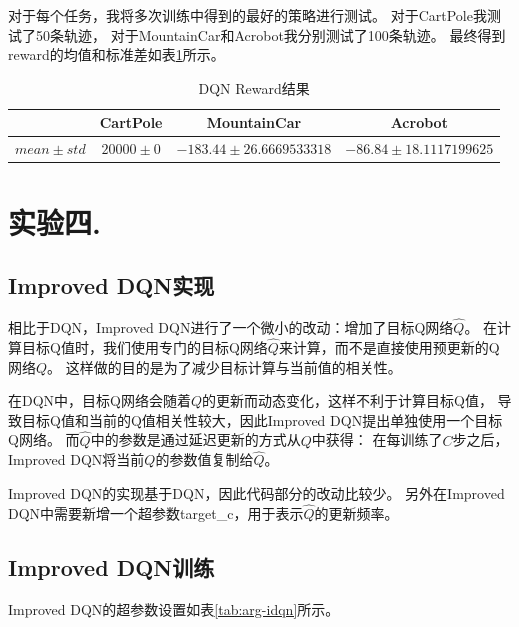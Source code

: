 \documentclass[a4paper,UTF8]{article}
\theoremstyle{definition}
\begin{document}
对于每个任务，我将多次训练中得到的最好的策略进行测试。
对于CartPole我测试了50条轨迹，
对于MountainCar和Acrobot我分别测试了100条轨迹。
最终得到reward的均值和标准差如表\ref{tab:reward-dqn}所示。

\begin{table}[H]
	\centering
	\caption{DQN Reward结果}\label{tab:reward-dqn}
	\begin{tabular}{c|ccc}
		\toprule
		& CartPole & MountainCar & Acrobot \\
		\midrule
		$mean \pm std$ & $20000 \pm 0$ & $-183.44 \pm 26.6669533318$ & $-86.84 \pm 18.1117199625$ \\
		\bottomrule
	\end{tabular}
\end{table}

\section*{实验四.}

\subsection*{Improved DQN实现}

相比于DQN，Improved DQN进行了一个微小的改动：增加了目标Q网络$\hat{Q}$。
在计算目标Q值时，我们使用专门的目标Q网络$\hat{Q}$来计算，而不是直接使用预更新的Q网络$Q$。
这样做的目的是为了减少目标计算与当前值的相关性。

在DQN中，目标Q网络会随着$Q$的更新而动态变化，这样不利于计算目标Q值，
导致目标Q值和当前的Q值相关性较大，因此Improved DQN提出单独使用一个目标Q网络。
而$\hat{Q}$中的参数是通过延迟更新的方式从$Q$中获得：
在每训练了$C$步之后，Improved DQN将当前$Q$的参数值复制给$\hat{Q}$。

Improved DQN的实现基于DQN，因此代码部分的改动比较少。
另外在Improved DQN中需要新增一个超参数target\_c，用于表示$\hat{Q}$的更新频率。

\subsection*{Improved DQN训练}

Improved DQN的超参数设置如表\ref{tab:arg-idqn}所示。
\end{document}
